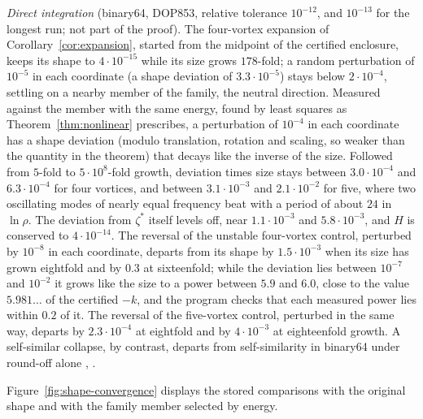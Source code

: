 \documentclass[11pt]{article}
\theoremstyle{definition}
\begin{document}
\emph{Direct integration} (binary64, DOP853, relative tolerance $10^{-12}$, and $10^{-13}$ for the longest run; not part of the proof). The four-vortex expansion of Corollary~\ref{cor:expansion}, started from the midpoint of the certified enclosure, keeps its shape to $4\cdot10^{-15}$ while its size grows $178$-fold; a random perturbation of $10^{-5}$ in each coordinate (a shape deviation of $3.3\cdot10^{-5}$) stays below $2\cdot10^{-4}$, settling on a nearby member of the family, the neutral direction. Measured against the member with the same energy, found by least squares as Theorem~\ref{thm:nonlinear} prescribes, a perturbation of $10^{-4}$ in each coordinate has a shape deviation (modulo translation, rotation and scaling, so weaker than the quantity in the theorem) that decays like the inverse of the size. Followed from $5$-fold to $5\cdot10^8$-fold growth, deviation times size stays between $3.0\cdot10^{-4}$ and $6.3\cdot10^{-4}$ for four vortices, and between $3.1\cdot10^{-3}$ and $2.1\cdot10^{-2}$ for five, where two oscillating modes of nearly equal frequency beat with a period of about $24$ in $\ln\rho$. The deviation from $\zeta^*$ itself levels off, near $1.1\cdot10^{-3}$ and $5.8\cdot10^{-3}$, and $H$ is conserved to $4\cdot10^{-14}$. The reversal of the unstable four-vortex control, perturbed by $10^{-8}$ in each coordinate, departs from its shape by $1.5\cdot10^{-3}$ when its size has grown eightfold and by $0.3$ at sixteenfold; while the deviation lies between $10^{-7}$ and $10^{-2}$ it grows like the size to a power between $5.9$ and $6.0$, close to the value $5.981\ldots$ of the certified $-k$, and the program checks that each measured power lies within $0.2$ of it. The reversal of the five-vortex control, perturbed in the same way, departs by $2.3\cdot10^{-4}$ at eightfold and by $4\cdot10^{-3}$ at eighteenfold growth. A self-similar collapse, by contrast, departs from self-similarity in binary64 under round-off alone \cite{lk2015}, \cite[Sect.~5.3]{cwr2026}.

Figure~\ref{fig:shape-convergence} displays the stored comparisons with the original shape and with the family member selected by energy.
\end{document}
